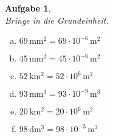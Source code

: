 \documentclass[12pt,fleqn]{article}
\theoremstyle{aufg}
\newtheorem{aufgabe}{Aufgabe}
\theoremstyle{bsp}
\begin{document}
\begin{flushleft}
\begin{aufgabe} ~ \\ 
Bringe in die Grundeinheit. \\ 
\begin{multicols}{3} 
\begin{enumerate}[a)] 
\item 
$69\,\mathrm{mm^2}=69\cdot 10^{-6} \,\mathrm{m^{2}}$
\item 
$45\,\mathrm{mm^2}=45\cdot 10^{-6} \,\mathrm{m^{2}}$
\item 
$52\,\mathrm{km^2}=52\cdot 10^{6} \,\mathrm{m^{2}}$
\item 
$93\,\mathrm{mm^3}=93\cdot 10^{-9} \,\mathrm{m^{3}}$
\item 
$20\,\mathrm{km^2}=20\cdot 10^{6} \,\mathrm{m^{2}}$
\item 
$98\,\mathrm{dm^3}=98\cdot 10^{-3} \,\mathrm{m^{3}}$
\end{enumerate} 
\end{multicols} 
\end{aufgabe} 
\end{flushleft} 
\end{document}

